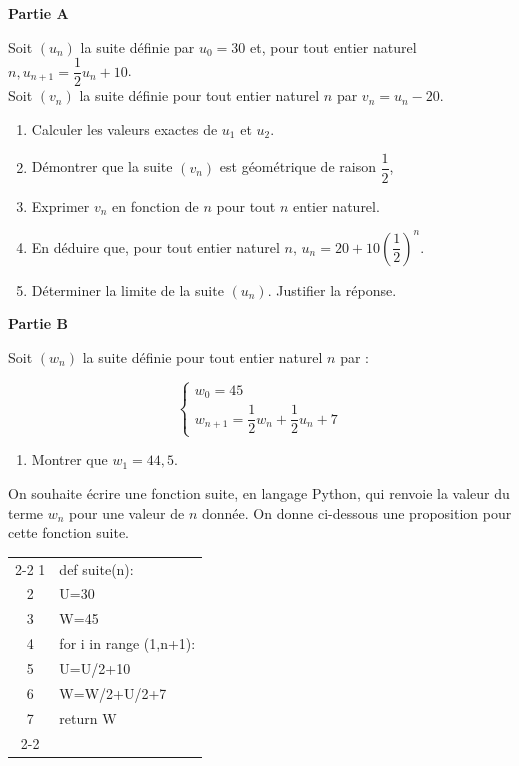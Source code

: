 
\medskip

\textbf{Partie A}

\medskip

Soit $\left(u_{n}\right)$ la suite définie par $u_{0}=30$ et, pour tout entier naturel $n, u_{n+1}=\dfrac{1}{2} u_{n}+10$.\\
Soit $\left(v_{n}\right)$ la suite définie pour tout entier naturel $n$ par $v_{n}=u_{n}-20$.

\begin{enumerate}
\item Calculer les valeurs exactes de $u_{1}$ et $u_{2}$.
\item Démontrer que la suite $\left(v_{n}\right)$ est géométrique de raison $\dfrac12$,
\item Exprimer $v_{n}$ en fonction de $n$ pour tout $n$ entier naturel.
\item En déduire que, pour tout entier naturel $n,\,  u_{n}=20+10\left(\dfrac{1}{2}\right)^{n}$.
\item Déterminer la limite de la suite $\left(u_{n}\right)$. Justifier la réponse.
\end{enumerate}

\textbf{Partie B}

\medskip

Soit $\left(w_{n}\right)$ la suite définie pour tout entier naturel $n$ par :

\[
\begin{cases}
w_{0}=45 \\
w_{n+1}=\dfrac{1}{2} w_{n}+\dfrac{1}{2} u_{n}+7
\end{cases}
\]

\begin{enumerate}
\item Montrer que $w_{1} = 44,5$.
\end{enumerate}

On souhaite écrire une fonction suite, en langage Python, qui renvoie la valeur du terme $w_{n}$ pour une valeur de $n$ donnée. On donne ci-dessous une proposition pour cette fonction suite.

\begin{center}
\begin{tabular}{c| l|}\cline{2-2}
1&def suite(n):\\
2&\quad U=30\\
3&\quad W=45\\
4&\quad for i in range (1,n+1):\\
5&\quad\quad   U=U/2+10\\
6&\quad\quad  W=W/2+U/2+7\\
7&\quad return W\\ \cline{2-2}
\end{tabular}
\end{center}

